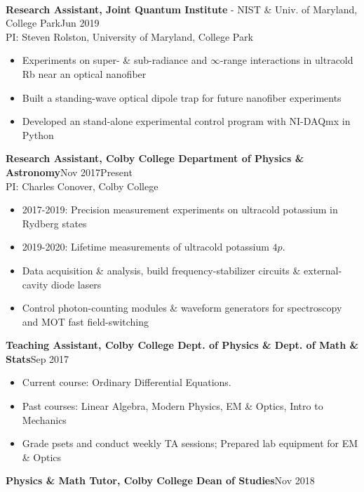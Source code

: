 \documentclass[letter, 10pt]{article}
\newcommand{\longunderline}[1]{\uline{#1\hfill\mbox{}}}
\begin{document}
	\vspace{-7pt}
	\noindent \longunderline{\normalsize{{}}}
	\\ \vspace{-7pt}
	
	\noindent \textbf{Research Assistant, Joint Quantum Institute} - NIST \& Univ. of Maryland, College Park\hfill Jun 2019\textemdash \\ 
	\noindent PI: {Steven Rolston}, University of Maryland, College Park
	\begin{itemize}[noitemsep, nolistsep]
		\item Experiments on super- \& sub-radiance and $\infty$-range interactions in ultracold Rb near an optical nanofiber
		\item Built a standing-wave optical dipole trap for future nanofiber experiments
		\item Developed an stand-alone experimental control program with NI-DAQmx in Python
	\end{itemize}
	\textbf{Research Assistant, Colby College Department of Physics \& Astronomy}\hfill Nov 2017\textemdash Present\\
	PI: {Charles Conover}, Colby College
	\begin{itemize}[noitemsep, nolistsep]
		\item 2017-2019: Precision measurement experiments on ultracold potassium in Rydberg states
		\item 2019-2020: Lifetime measurements of ultracold potassium $4p$.
		\item Data acquisition \& analysis, build frequency-stabilizer circuits \& external-cavity diode lasers
		\item Control photon-counting modules \& waveform generators for spectroscopy and MOT fast field-switching

	\end{itemize}	
 	\textbf{Teaching Assistant, Colby College Dept. of Physics \& Dept. of Math \& Stats}\hfill Sep  2017\textemdash  
	\begin{itemize}[noitemsep, nolistsep]
		\item Current course: Ordinary Differential Equations. 
		\item Past courses: Linear Algebra, Modern Physics, EM \& Optics, Intro to Mechanics
		\item Grade psets and conduct weekly TA sessions; Prepared lab equipment for EM \& Optics
	\end{itemize}
	\textbf{Physics \& Math Tutor, Colby College Dean of Studies}\hfill Nov 2018\textemdash 
\end{document}
